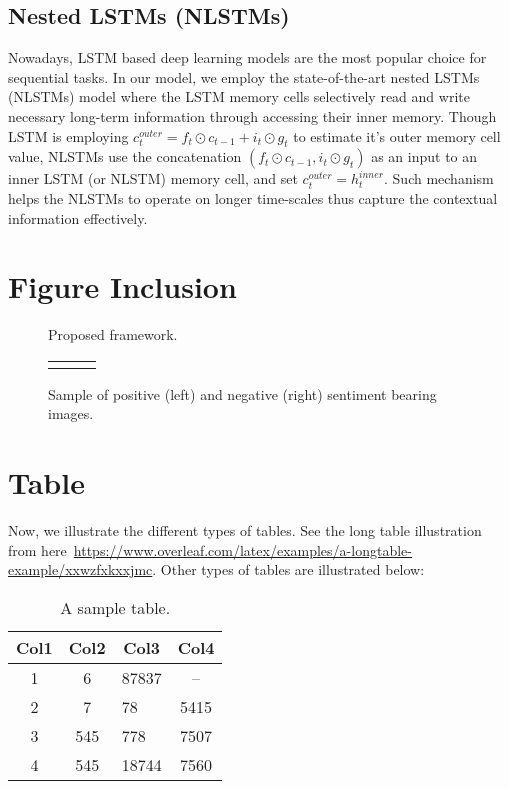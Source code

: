 \documentclass[11pt]{article}
\begin{document}
{%

\subsection{Nested LSTMs (NLSTMs)}
\label{ref:nestedLSTMs}
Nowadays, LSTM based deep learning models are the most popular choice for sequential tasks. In our model, we employ the state-of-the-art nested LSTMs (NLSTMs) model where the LSTM memory cells selectively read and write necessary long-term information through accessing their inner memory. Though LSTM is employing $c_{t}^{outer}={f_{t}}\odot{c_{t-1}}+{i_{t}}\odot{g_{t}}$ to estimate it's outer memory cell value, NLSTMs use the concatenation $({f_{t}}\odot{c_{t-1}},{i_{t}}\odot{g_{t}})$ as an input to an inner LSTM (or NLSTM) memory cell, and set $c_{t}^{outer}=h_{t}^{inner}$. Such mechanism helps the NLSTMs to operate on longer time-scales thus capture the contextual information effectively.


\section{Figure Inclusion}
\label{ref:figure}

\begin{figure}[!htb]
\centering

\caption{Proposed framework.}
\label{fig:overview}
\end{figure}


\begin{figure}[!htb]
\centering
\begin{tabular}{cp{0.5cm}c}
&
\end{tabular}
\caption{Sample of positive (left) and negative (right) sentiment bearing images.}
\label{Fig:sampleImage}
\end{figure}

\section{Table}
\label{ref:table}
Now, we illustrate the different types of tables. See the long table illustration from here~\url{https://www.overleaf.com/latex/examples/a-longtable-example/xxwzfxkxxjmc}. Other types of tables are illustrated below:

\begin{table}[!h]
\centering
\caption{A sample table.}
\begin{tabular}{|c|c|l|c|} 
\hline
\textbf{Col1} & \textbf{Col2} & \multicolumn{1}{c|}{\textbf{Col3}} & \textbf{Col4} \\
\hline
1 & 6 & 87837 & --\\ 
\hline
2 & 7 & 78 & 5415 \\
\hline
3 & 545 & 778 & 7507 \\
\hline
4 & 545 & 18744 & 7560 \\
\hline
\end{tabular}
\end{table}


}
\end{document}
